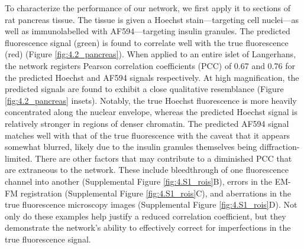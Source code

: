 To characterize the performance of our network, we first apply it to sections of rat pancreas tissue. The tissue is given a Hoechst stain---targeting cell nuclei---as well as immunolabelled with AF594---targeting insulin granules. The predicted fluorescence signal (green) is found to correlate well with the true fluorescence (red) (Figure \ref{fig:4.2_pancreas}). When applied to an entire islet of Langerhans, the network registers Pearson correlation coefficients (PCC) of 0.67 and 0.76 for the predicted Hoechst and AF594 signals respectively. At high magnification, the predicted signals are found to exhibit a close qualitative resemblance (Figure \ref{fig:4.2_pancreas} insets). Notably, the true Hoechst fluorescence is more heavily concentrated along the nuclear envelope, whereas the predicted Hoechst signal is relatively stronger in regions of denser chromatin. The predicted AF594 signal matches well with that of the true fluorescence with the caveat that it appears somewhat blurred, likely due to the insulin granules themselves being diffraction-limited. There are other factors that may contribute to a diminished PCC that are extraneous to the network. These include bleedthrough of one fluorescence channel into another (Supplemental Figure \ref{fig:4.S1_rois}B), errors in the EM-FM registration (Supplemental Figure \ref{fig:4.S1_rois}C), and aberrations in the true fluorescence microscopy images (Supplemental Figure \ref{fig:4.S1_rois}D). Not only do these examples help justify a reduced correlation coefficient, but they demonstrate the network's ability to effectively correct for imperfections in the true fluorescence signal.


